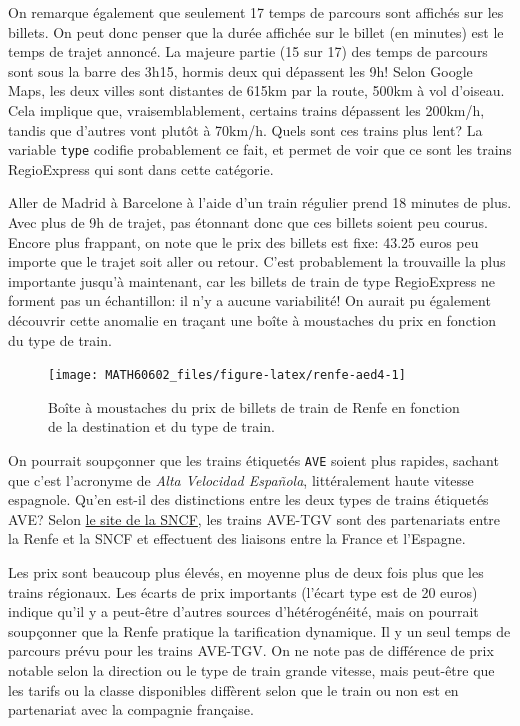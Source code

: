 \documentclass[
  11pt,
  letterpaper,
]{book}
\theoremstyle{definition}
\theoremstyle{definition}
\theoremstyle{definition}
\theoremstyle{definition}
\theoremstyle{remark}
\begin{document}
On remarque également que seulement 17 temps de parcours sont affichés sur les billets. On peut donc penser que la durée affichée sur le billet (en minutes) est le temps de trajet annoncé. La majeure partie (15 sur 17) des temps de parcours sont sous la barre des 3h15, hormis deux qui dépassent les 9h! Selon Google Maps, les deux villes sont distantes de 615km par la route, 500km à vol d'oiseau. Cela implique que, vraisemblablement, certains trains dépassent les 200km/h, tandis que d'autres vont plutôt à 70km/h. Quels sont ces trains plus lent? La variable \texttt{type} codifie probablement ce fait, et permet de voir que ce sont les trains RegioExpress qui sont dans cette catégorie.

Aller de Madrid à Barcelone à l'aide d'un train régulier prend 18 minutes de plus. Avec plus de 9h de trajet, pas étonnant donc que ces billets soient peu courus. Encore plus frappant, on note que le prix des billets est fixe: 43.25 euros peu importe que le trajet soit aller ou retour. C'est probablement la trouvaille la plus importante jusqu'à maintenant, car les billets de train de type RegioExpress ne forment pas un échantillon: il n'y a aucune variabilité! On aurait pu également découvrir cette anomalie en traçant une boîte à moustaches du prix en fonction du type de train.

\begin{figure}

{\centering \texttt{[image: MATH60602\_files/figure-latex/renfe-aed4-1]} 

}

\caption{Boîte à moustaches du prix de billets de train de Renfe en fonction de la destination et du type de train.}\label{fig:renfe-aed4}
\end{figure}

On pourrait soupçonner que les trains étiquetés \texttt{AVE} soient plus rapides, sachant que c'est l'acronyme de \emph{Alta Velocidad Española}, littéralement haute vitesse espagnole. Qu'en est-il des distinctions entre les deux types de trains étiquetés AVE? Selon \href{https://www.renfe-sncf.com/rw-en/services/a-unique-experience/Pages/services.aspx}{le site de la SNCF}, les trains AVE-TGV sont des partenariats entre la Renfe et la SNCF et effectuent des liaisons entre la France et l'Espagne.

Les prix sont beaucoup plus élevés, en moyenne plus de deux fois plus que les trains régionaux. Les écarts de prix importants (l'écart type est de 20 euros) indique qu'il y a peut-être d'autres sources d'hétérogénéité, mais on pourrait soupçonner que la Renfe pratique la tarification dynamique. Il y un seul temps de parcours prévu pour les trains AVE-TGV. On ne note pas de différence de prix notable selon la direction ou le type de train grande vitesse, mais peut-être que les tarifs ou la classe disponibles diffèrent selon que le train ou non est en partenariat avec la compagnie française.
\end{document}
